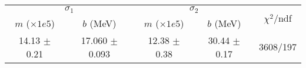 \begin{tabular}{cc|cc||c}
\multicolumn{2}{c|}{$\sigma_1$} & \multicolumn{2}{|c}{$\sigma_2$}  & \multirow{2}{*}{$\chi^2/$ndf}\\
$m$ ($\times1e5$) & $b$ (MeV) & $m$ ($\times1e5$) & $b$ (MeV)  & \\
\hline
14.13 $\pm$ 0.21 & 17.060 $\pm$ 0.093 & 12.38 $\pm$ 0.38 & 30.44 $\pm$ 0.17 & 3608/197\\
\end{tabular}
